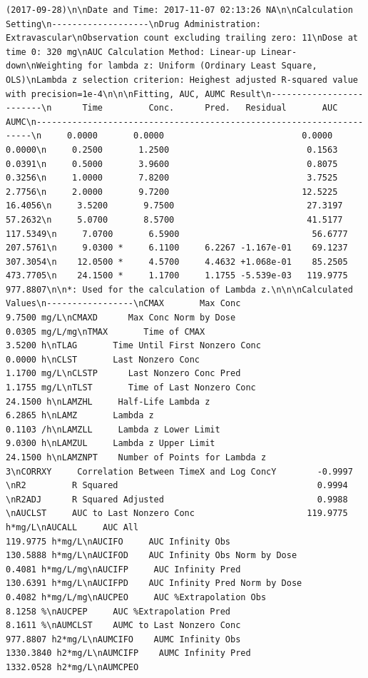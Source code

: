 \documentclass[12pt,]{krantz}
\theoremstyle{definition}
\theoremstyle{definition}
\theoremstyle{definition}
\theoremstyle{remark}
\begin{document}
\begin{verbatim}
(2017-09-28)\n\nDate and Time: 2017-11-07 02:13:26 NA\n\nCalculation Setting\n-------------------\nDrug Administration: Extravascular\nObservation count excluding trailing zero: 11\nDose at time 0: 320 mg\nAUC Calculation Method: Linear-up Linear-down\nWeighting for lambda z: Uniform (Ordinary Least Square, OLS)\nLambda z selection criterion: Heighest adjusted R-squared value with precision=1e-4\n\n\nFitting, AUC, AUMC Result\n-------------------------\n      Time         Conc.      Pred.   Residual       AUC       AUMC\n---------------------------------------------------------------------\n     0.0000       0.0000                           0.0000     0.0000\n     0.2500       1.2500                           0.1563     0.0391\n     0.5000       3.9600                           0.8075     0.3256\n     1.0000       7.8200                           3.7525     2.7756\n     2.0000       9.7200                          12.5225    16.4056\n     3.5200       9.7500                          27.3197    57.2632\n     5.0700       8.5700                          41.5177   117.5349\n     7.0700       6.5900                          56.6777   207.5761\n     9.0300 *     6.1100     6.2267 -1.167e-01    69.1237   307.3054\n    12.0500 *     4.5700     4.4632 +1.068e-01    85.2505   473.7705\n    24.1500 *     1.1700     1.1755 -5.539e-03   119.9775   977.8807\n\n*: Used for the calculation of Lambda z.\n\n\nCalculated Values\n-----------------\nCMAX       Max Conc                                        9.7500 mg/L\nCMAXD      Max Conc Norm by Dose                           0.0305 mg/L/mg\nTMAX       Time of CMAX                                    3.5200 h\nTLAG       Time Until First Nonzero Conc                   0.0000 h\nCLST       Last Nonzero Conc                               1.1700 mg/L\nCLSTP      Last Nonzero Conc Pred                          1.1755 mg/L\nTLST       Time of Last Nonzero Conc                      24.1500 h\nLAMZHL     Half-Life Lambda z                              6.2865 h\nLAMZ       Lambda z                                        0.1103 /h\nLAMZLL     Lambda z Lower Limit                            9.0300 h\nLAMZUL     Lambda z Upper Limit                           24.1500 h\nLAMZNPT    Number of Points for Lambda z                   3\nCORRXY     Correlation Between TimeX and Log ConcY        -0.9997 \nR2         R Squared                                       0.9994 \nR2ADJ      R Squared Adjusted                              0.9988 \nAUCLST     AUC to Last Nonzero Conc                      119.9775 h*mg/L\nAUCALL     AUC All                                       119.9775 h*mg/L\nAUCIFO     AUC Infinity Obs                              130.5888 h*mg/L\nAUCIFOD    AUC Infinity Obs Norm by Dose                   0.4081 h*mg/L/mg\nAUCIFP     AUC Infinity Pred                             130.6391 h*mg/L\nAUCIFPD    AUC Infinity Pred Norm by Dose                  0.4082 h*mg/L/mg\nAUCPEO     AUC %Extrapolation Obs                          8.1258 %\nAUCPEP     AUC %Extrapolation Pred                         8.1611 %\nAUMCLST    AUMC to Last Nonzero Conc                     977.8807 h2*mg/L\nAUMCIFO    AUMC Infinity Obs                            1330.3840 h2*mg/L\nAUMCIFP    AUMC Infinity Pred                           1332.0528 h2*mg/L\nAUMCPEO    
\end{verbatim}
\end{document}
